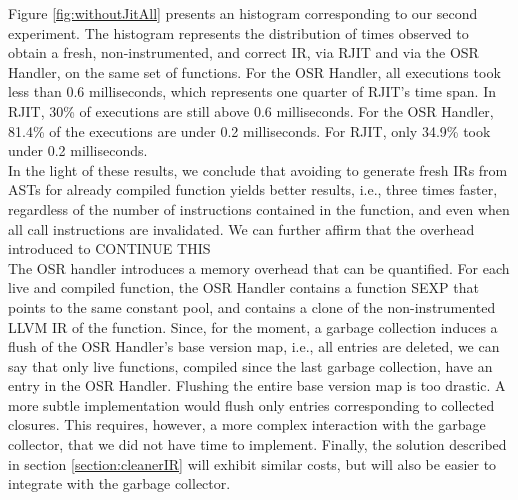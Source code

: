 Figure \ref{fig:withoutJitAll} presents an histogram corresponding to our second experiment.
The histogram represents the distribution of times observed to obtain a fresh, non-instrumented, and correct IR, via RJIT and via the OSR Handler, on the same set of functions.
For the OSR Handler, all executions took less than 0.6 milliseconds, which represents one quarter of RJIT's time span.
In RJIT, 30\% of executions are still above 0.6 milliseconds.
For the OSR Handler, 81.4\% of the executions are under 0.2 milliseconds.
For RJIT, only 34.9\% took under 0.2 milliseconds.\\

In the light of these results, we conclude that avoiding to generate fresh IRs from ASTs for already compiled function yields better results, i.e., three times faster, regardless of the number of instructions contained in the function, and even when all call instructions are invalidated.
We can further affirm that the overhead introduced to CONTINUE THIS\\

The OSR handler introduces a memory overhead that can be quantified.
For each live and compiled function, the OSR Handler contains a function SEXP that points to the same constant pool, and contains a clone of the non-instrumented LLVM IR of the function.
Since, for the moment, a garbage collection induces a flush of the OSR Handler's base version map, i.e., all entries are deleted, we can say that only live functions, compiled since the last garbage collection, have an entry in the OSR Handler.
Flushing the entire base version map is too drastic. 
A more subtle implementation would flush only entries corresponding to collected closures.
This requires, however, a more complex interaction with the garbage collector, that we did not have time to implement.
Finally, the solution described in section \ref{section:cleanerIR} will exhibit similar costs, but will also be easier to integrate with the garbage collector.\\
